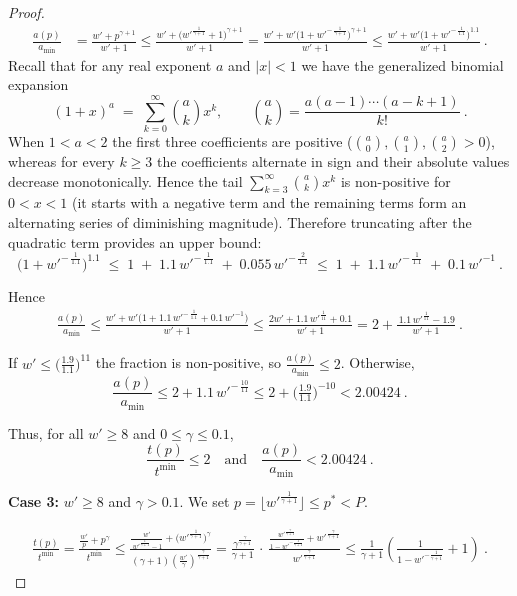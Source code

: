 \documentclass{article}
\begin{document}
\begin{proof}
\begin{align*}
\frac{a(p)}{a_{\min}} &= \frac{w'+p^{\gamma+1}}{w'+1}\le \frac{w'+\bigl(w'^{\frac{1}{\gamma+1}}+1\bigr)^{\gamma+1}}{w'+1}=   \frac{w'+w'\!\bigl(1+w'^{-\,\frac{1}{\gamma+1}}\bigr)^{\gamma+1}}{w'+1} \le \frac{w'+w'\!\bigl(1+w'^{-\,\frac{1}{1.1}}\bigr)^{1.1}}{w'+1}\ .
\end{align*}
Recall that for any real exponent $a$ and $|x|<1$ we have the generalized
binomial expansion
\[
(1+x)^a \;=\; \sum_{k=0}^{\infty} \binom{a}{k} x^{k},
\qquad
\binom{a}{k} = \frac{a(a-1)\cdots(a-k+1)}{k!}\ .
\]
When $1 < a < 2$ the first three coefficients are positive
($\binom{a}{0},\binom{a}{1},\binom{a}{2} > 0$),
whereas for every $k\ge 3$ the coefficients alternate in sign
and their absolute values decrease monotonically.
Hence the tail
\(
\sum_{k=3}^{\infty} \binom{a}{k} x^{k}
\)
is non-positive for $0 < x < 1$ (it starts with a negative term and the
remaining terms form an alternating series of diminishing magnitude).
Therefore truncating after the quadratic term provides an upper bound:
\[
\bigl(1+w'^{-\,\tfrac{1}{1.1}}\bigr)^{1.1}
   \;\le\;
   1 \;+\; 1.1\,w'^{-\,\tfrac{1}{1.1}}
   \;+\; 0.055\,w'^{-\,\tfrac{2}{1.1}}
   \;\le\;
   1 \;+\; 1.1\,w'^{-\,\tfrac{1}{1.1}}
   \;+\; 0.1\,w'^{-1}\ .
\]


Hence
\begin{align*}
\frac{a(p)}{a_{\min}} \le \frac{w'+w'\bigl(1+1.1\,w'^{-\,\frac{1}{1.1}}+0.1\,w'^{-1}\bigr)}{w'+1} \le \frac{2w'+1.1\,w'^{\frac{1}{11}}+0.1}{w'+1} =   2+\frac{\,1.1\,w'^{\frac{1}{11}}-1.9}{w'+1}\ .
\end{align*}

If \(w'\le \bigl(\tfrac{1.9}{1.1}\bigr)^{11}\) the fraction is non-positive,
so \(\frac{a(p)}{a_{\min}}\le 2\).
Otherwise,
\[
\frac{a(p)}{a_{\min}}
    \le 2+1.1\,w'^{-\,\frac{10}{11}}
    \le 2+\bigl(\tfrac{1.9}{1.1}\bigr)^{-10}
    < 2.00424\ .
\]

Thus, for all \(w'\ge 8\) and \(0\le\gamma\le0.1\),
\[
\frac{t(p)}{t^{\min}}\le 2
\quad\text{and}\quad
\frac{a(p)}{a_{\min}}<2.00424\ .
\]

\textbf{Case 3:}  $w' \ge 8$ and $\gamma > 0.1$.  
We set \(p=\bigl\lfloor w'^{\frac{1}{\gamma+1}}\bigr\rfloor \leq p^* <P \).

\begin{align*}
\frac{t(p)}{t^{\min}} = \frac{\tfrac{w'}{p}+p^\gamma}{t^{\min}} \le \frac{\displaystyle
              \frac{w'}{\,w'^{\frac{1}{\gamma+1}}-1}
              +\bigl(w'^{\frac{1}{\gamma+1}}\bigr)^{\gamma}}
            {(\gamma+1)\!\left(\frac{w'}{\gamma}\right)^{\frac{\gamma}{\gamma+1}}}= \frac{\gamma^{\frac{\gamma}{\gamma+1}}}{\gamma+1}
      \,\cdot\,
      \frac{\displaystyle
            \tfrac{w'^{\frac{\gamma}{\gamma+1}}}{1-w'^{-\frac{1}{\gamma+1}}}
            +w'^{\frac{\gamma}{\gamma+1}}}
           {w'^{\frac{\gamma}{\gamma+1}}} \le \frac{1}{\gamma+1}\!
      \left(\frac{1}{1-w'^{-\frac{1}{\gamma+1}}}+1\right)\ .
\end{align*}


\end{proof}
\end{document}
